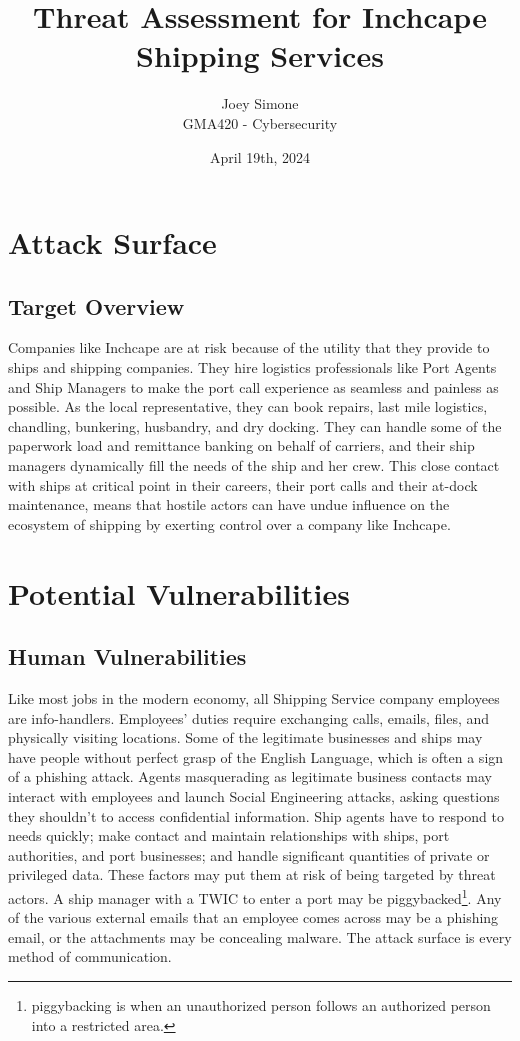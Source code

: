 \documentclass[12pt]{article}
\title{Threat Assessment for Inchcape Shipping Services}
\author{Joey Simone\\GMA420 - Cybersecurity}
\date{April 19th, 2024}
\let\footcite\footfullcite
\begin{document}
\maketitle


\section{Attack Surface}
\subsection{Target Overview}
Companies like Inchcape are at risk because of the utility that they provide to ships and shipping companies. They hire logistics professionals like Port Agents and Ship Managers to make the port call experience as seamless and painless as possible. As the local representative, they can book repairs, last mile logistics, chandling, bunkering, husbandry, and dry docking. They can handle some of the paperwork load and remittance banking on behalf of carriers, and their ship managers dynamically fill the needs of the ship and her crew. \footcite{noauthor_efficient_2022}
This close contact with ships at critical point in their careers, their port calls and their at-dock maintenance, means that hostile actors can have undue influence on the ecosystem of shipping by exerting control over a company like Inchcape. 

\section{Potential Vulnerabilities}
\subsection{Human Vulnerabilities} Like most jobs in the modern economy, all Shipping Service company employees are info-handlers. Employees' duties require exchanging calls, emails, files, and physically visiting locations. Some of the legitimate businesses and ships may have people without perfect grasp of the English Language, which is often a sign of a phishing attack. Agents masquerading as legitimate business contacts may interact with employees and launch Social Engineering attacks, asking questions they shouldn't to access confidential information. Ship agents have to respond to needs quickly; make contact and maintain relationships with ships, port authorities, and port businesses; and handle significant quantities of private or privileged data. These factors may put them at risk of being targeted by threat actors. A ship manager with a TWIC to enter a port may be piggybacked\footnote{piggybacking is when an unauthorized person follows an authorized person into a restricted area.}. Any of the various external emails that an employee comes across may be a phishing email, or the attachments may be concealing malware. The attack surface is every method of communication.
\end{document}
